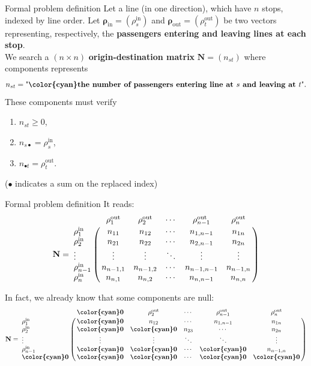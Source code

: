 \documentclass[10pt]{beamer}
\newcommand{\imp}[1]{\textbf{\color{cyan}#1}}
\begin{document}
	
	\begin{frame}{Formal problem definition}
		Let a line (in one direction), which have $n$ stops, indexed by line order. Let $\bm{\rho}_\text{in} = (\rho^\text{in}_s)$ and $\bm{\rho}_\text{out} = (\rho^\text{out}_t)$ be two vectors representing, respectively, the \imp{passengers entering and leaving lines at each stop}. \\
		\vspace{0.4cm}
		We search a $(n \times n)$ \imp{origin-destination matrix} $\mathbf{N} = (n_{st})$ where components represents
		$$
			n_{st} = \text{"\imp{the number of passengers entering line at $s$ and leaving at $t$}"}.
		$$
		These components must verify
		\begin{enumerate}
			\item $n_{st} \geq 0$,
			\item $n_{s\bullet} = \rho^\text{in}_s$,
			\item $n_{\bullet t} = \rho^\text{out}_t$.
		\end{enumerate}
		\small ($\bullet$ indicates a sum on the replaced index)
	\end{frame}
	
	
	\begin{frame}{Formal problem definition}
		\small
		It reads:
		$$
		\mathbf{N} = \bordermatrix{
			& \rho^\text{out}_1 & \rho^\text{out}_2  & \cdots & \rho^\text{out}_{n-1} & \rho^\text{out}_n   \cr
			\rho^\text{in}_1 & n_{11} & n_{12} & \cdots & n_{1,n-1} & n_{1n} \cr
			\rho^\text{in}_2 & n_{21} & n_{22} & \cdots & n_{2,n-1} & n_{2n} \cr
			\vdots & \vdots & \vdots & \ddots & \vdots & \vdots \cr
			\rho^\text{in}_{n-1} & n_{n-1,1} & n_{n-1,2} & \cdots & n_{n-1,n-1} & n_{n-1,n} \cr
			\rho^\text{in}_{n} & n_{n,1} & n_{n,2} & \cdots & n_{n,n-1} & n_{n,n}}
		$$
		
		In fact, we already know that some components are null:
		$$
		\mathbf{N} = \bordermatrix{
			& \imp{0} & \rho^\text{out}_2  & \cdots & \rho^\text{out}_{n-1} & \rho^\text{out}_n \cr
			\rho^\text{in}_1 & \imp{0} & n_{12} & \cdots & n_{1,n-1} & n_{1n} \cr
			\rho^\text{in}_2 & \imp{0} & \imp{0} & n_{23} & \cdots & n_{2n} \cr
			\vdots & \vdots & \vdots & \ddots & \ddots & \vdots \cr
			\rho^\text{in}_{n-1} & \imp{0} & \imp{0} & \cdots & \imp{0} & n_{n-1,n} \cr
			\imp{0} & \imp{0} & \imp{0} & \cdots & \imp{0} & \imp{0}}
		$$
	\end{frame}
	
\end{document}
